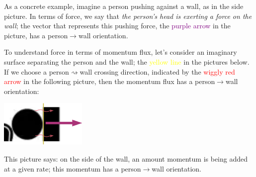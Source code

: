 \documentclass[a4paper,12pt,%
onecolumn,oneside,%
british%
]{memoir}
\renewcommand*{\|}[1][]{\nonscript\:#1\vert\nonscript\:\mathopen{}}
\begin{document}
As a concrete example, imagine a person pushing against a wall, as in the side picture. In terms of force, we say that \emph{the person's head is exerting a force on the wall}; the vector that represents this pushing force, the \textcolor{purple}{purple arrow} in the picture, has a person$\to$wall orientation.
%
%

To understand force in terms of momentum flux, let's consider an imaginary surface separating the person and the wall; the \textcolor{yellow}{yellow line} in the pictures below. If we choose a person$\rightsquigarrow$wall crossing direction, indicated by the \textcolor{red}{wiggly red arrow} in the following picture, then the momentum flux has a person$\rightarrow$wall orientation:\noprelistbreak
\begin{center}
  \includegraphics[height=6em]{images/person_push_flux_right.pdf}
\end{center}
This picture says: on the side of the wall, an amount momentum is being added at a given rate; this momentum has a person$\rightarrow$wall orientation.
\end{document}
